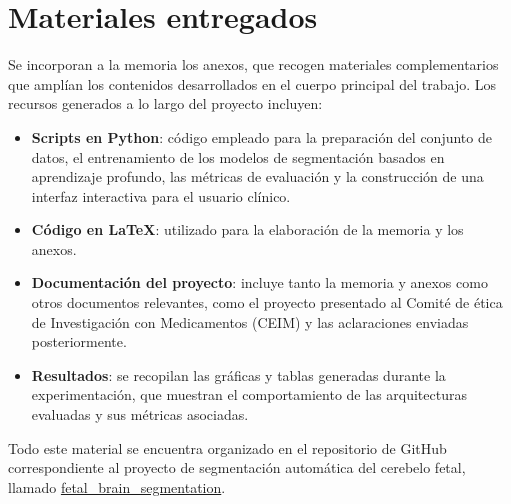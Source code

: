 \section{Materiales entregados}
Se incorporan a la memoria los anexos, que recogen materiales complementarios que amplían los contenidos desarrollados en el cuerpo principal del trabajo. Los recursos generados a lo largo del proyecto incluyen:
\begin{itemize}
    \item \textbf{Scripts en Python}: código empleado para la preparación del conjunto de datos, el entrenamiento de los modelos de segmentación basados en aprendizaje profundo, las métricas de evaluación y la construcción de una interfaz interactiva para el usuario clínico.
    \item \textbf{Código en LaTeX}: utilizado para la elaboración de la memoria y los anexos.
    \item \textbf{Documentación del proyecto}: incluye tanto la memoria y anexos como otros documentos relevantes, como el proyecto presentado al Comité de ética de Investigación con Medicamentos (CEIM) y las aclaraciones enviadas posteriormente.
    \item \textbf{Resultados}: se recopilan las gráficas y tablas generadas durante la experimentación, que muestran el comportamiento de las arquitecturas evaluadas y sus métricas asociadas.
\end{itemize}

Todo este material se encuentra organizado en el repositorio de GitHub correspondiente al proyecto de segmentación automática del cerebelo fetal, llamado \href{https://github.com/eirarodriguez/fetal_brain_segmentation} {fetal\_brain\_segmentation}.




